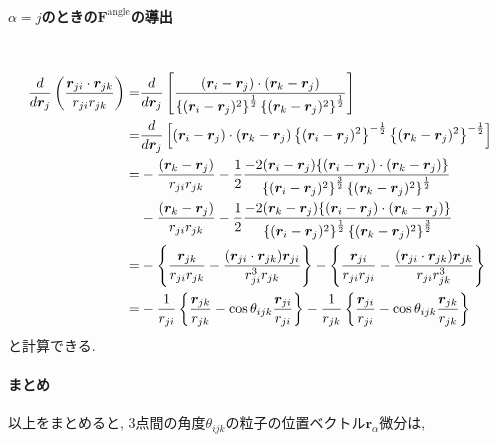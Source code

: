 \paragraph{$\alpha = j$のときの$\bm{F}^{\mathrm{angle}}$の導出} \
\begin{align}
    \frac{d}{d \bm{r}_{j}}
    \left(\frac{\bm{r}_{ji} \cdot \bm{r}_{jk}}{r_{ji} r_{jk}}\right)
 =&
    \frac{d}{d \bm{r}_{j}}
    \left[\frac{(\bm{r}_{i} - \bm{r}_{j}) \cdot (\bm{r}_{k} - \bm{r}_{j})}
               {\left\{ (\bm{r}_{i} - \bm{r}_{j})^{2} \right\}^{\frac{1}{2}}
                \left\{ (\bm{r}_{k} - \bm{r}_{j})^{2} \right\}^{\frac{1}{2}}}
    \right]
 \notag \\
 =&
    \frac{d}{d \bm{r}_{j}}
    \left[(\bm{r}_{i} - \bm{r}_{j}) \cdot (\bm{r}_{k} - \bm{r}_{j})
           \left\{ (\bm{r}_{i} - \bm{r}_{j})^{2} \right\}^{-\frac{1}{2}}
           \left\{ (\bm{r}_{k} - \bm{r}_{j})^{2} \right\}^{-\frac{1}{2}}
    \right]
 \notag \\
 =&
   - \frac{(\bm{r}_{k} - \bm{r}_{j})}{r_{ji} r_{jk}}
   - \frac{1}{2}
     \frac{-2(\bm{r}_{i} - \bm{r}_{j})
            \{(\bm{r}_{i} - \bm{r}_{j}) \cdot (\bm{r}_{k} - \bm{r}_{j})\}}
          {\left\{ (\bm{r}_{i} - \bm{r}_{j})^{2} \right\}^{\frac{3}{2}}
           \left\{ (\bm{r}_{k} - \bm{r}_{j})^{2} \right\}^{\frac{1}{2}}}
 \notag \\
 & - \frac{(\bm{r}_{k} - \bm{r}_{j})}{r_{ji} r_{jk}}
   - \frac{1}{2}
     \frac{-2(\bm{r}_{k} - \bm{r}_{j})
            \{(\bm{r}_{i} - \bm{r}_{j}) \cdot (\bm{r}_{k} - \bm{r}_{j})\}}
          {\left\{ (\bm{r}_{i} - \bm{r}_{j})^{2} \right\}^{\frac{1}{2}}
           \left\{ (\bm{r}_{k} - \bm{r}_{j})^{2} \right\}^{\frac{3}{2}}}
 \notag \\
 =& - \left\{
               \frac{\bm{r}_{jk}}{r_{ji} r_{jk}}
             - \frac{(\bm{r}_{ji} \cdot \bm{r}_{jk}) \bm{r}_{ji}}{r_{ji}^{3} r_{jk}}
      \right\}
    - \left\{
               \frac{\bm{r}_{ji}}{r_{ji} r_{ji}}
             - \frac{(\bm{r}_{ji} \cdot \bm{r}_{jk}) \bm{r}_{jk}}{r_{ji} r_{jk}^{3}}
      \right\}
 \notag \\
 =&
   - \frac{1}{r_{ji}}
     \left\{
              \frac{\bm{r}_{jk}}{r_{jk}}
            - \cos\theta_{ijk} \frac{\bm{r}_{ji}}{r_{ji}}
     \right\}
   - \frac{1}{r_{jk}}
     \left\{
              \frac{\bm{r}_{ji}}{r_{ji}}
            - \cos\theta_{ijk} \frac{\bm{r}_{jk}}{r_{jk}}
     \right\}
\notag
\end{align}
と計算できる.

\paragraph{まとめ}
以上をまとめると, 3点間の角度$\theta_{ijk}$の粒子の位置ベクトル$\bm{r}_{\alpha}$微分は,

